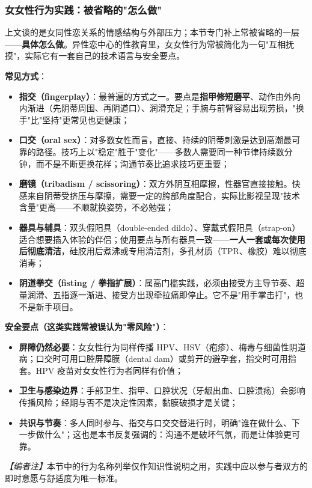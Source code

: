 \subsubsection{女女性行为实践：被省略的"怎么做"}

上文谈的是女同性恋关系的情感结构与外部压力；本节专门补上常被省略的一层——\textbf{具体怎么做}。异性恋中心的性教育里，女女性行为常被简化为一句"互相抚摸"，实际它有一套自己的技术语言与安全要点。

\textbf{常见方式}：
\begin{itemize}
\item \textbf{指交（fingerplay）}：最普遍的方式之一。要点是\textbf{指甲修短磨平}、动作由外向内渐进（先阴蒂周围、再阴道口）、润滑充足；手腕与前臂容易出现劳损，"换手"比"坚持"更常见也更健康；
\item \textbf{口交（oral sex）}：对多数女性而言，直接、持续的阴蒂刺激是达到高潮最可靠的路径。技巧上以"稳定"胜于"变化"——多数人需要同一种节律持续数分钟，而不是不断更换花样；沟通节奏比追求技巧更重要；
\item \textbf{磨镜（tribadism / scissoring）}：双方外阴互相摩擦，性器官直接接触。快感来自阴蒂受挤压与摩擦，需要一定的胯部角度配合，实际比影视呈现"技术含量"更高——不顺就换姿势，不必勉强；
\item \textbf{器具与辅具}：双头假阳具（double-ended dildo）、穿戴式假阳具（strap-on）适合想要插入体验的伴侣；使用要点与所有器具一致——\textbf{一人一套或每次使用后彻底清洁}，硅胶用后煮沸或专用清洁剂，多孔材质（TPR、橡胶）难以彻底消毒；
\item \textbf{阴道拳交（fisting / 拳指扩展）}：属高门槛实践，必须由接受方主导节奏、超量润滑、五指逐一渐进、接受方出现牵拉痛即停止。它不是"用手掌击打"，也不是新手项目。
\end{itemize}

\textbf{安全要点（这类实践常被误认为"零风险"）}：
\begin{itemize}
\item \textbf{屏障仍然必要}：女女性行为同样传播 HPV、HSV（疱疹）、梅毒与细菌性阴道病；口交时可用口腔屏障膜（dental dam）或剪开的避孕套，指交时可用指套。HPV 疫苗对女女性行为者同样有价值；
\item \textbf{卫生与感染边界}：手部卫生、指甲、口腔状况（牙龈出血、口腔溃疡）会影响传播风险；经期与否不是决定性因素，黏膜破损才是关键；
\item \textbf{共识与节奏}：多人同时参与、指交与口交交替进行时，明确"谁在做什么、下一步做什么"；这也是本书反复强调的：沟通不是破坏气氛，而是让体验更可靠。
\end{itemize}

\noindent\textit{【编者注】}本节中的行为名称列举仅作知识性说明之用，实践中应以参与者双方的即时意愿与舒适度为唯一标准。
